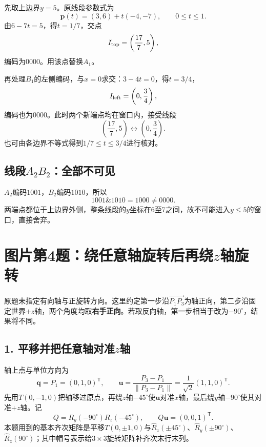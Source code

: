 先取上边界$y=5$。原线段参数式为
\[
\boldsymbol p(t)=(3,6)+t(-4,-7),\qquad0\leq t\leq1.
\]
由$6-7t=5$，得$t=1/7$，交点
\[
I_{\rm top}=\left(\frac{17}{7},5\right),
\]
编码为$0000$。用该点替换$A_1$。

再处理$B_1$的左侧编码，与$x=0$求交：$3-4t=0$，得$t=3/4$，
\[
I_{\rm left}=\left(0,\frac34\right),
\]
编码也为$0000$。此时两个新端点均在窗口内，接受线段
\[
\boxed{\left(\frac{17}{7},5\right)\longleftrightarrow\left(0,\frac34\right).}
\]
也可由各边界不等式得到$1/7\leq t\leq3/4$进行核对。

\subsection*{线段$A_2B_2$：全部不可见}
$A_2$编码$1001$，$B_2$编码$1010$，所以
\[
1001\mathbin{\&}1010=1000\ne0000.
\]
两端点都位于上边界外侧，整条线段的$y$坐标在6至7之间，故不可能进入$y\leq5$的窗口，直接舍弃。

\section{图片第4题：绕任意轴旋转后再绕$z$轴旋转}
\sol 原题未指定有向轴与正旋转方向。这里约定第一步沿$\overrightarrow{P_1P_3}$为轴正向，第二步沿固定世界$+z$轴，两个角度均取\textbf{右手正向}。若取反向轴，第一步相当于改为$-90^\circ$，结果将不同。

\subsection*{1. 平移并把任意轴对准$z$轴}
轴上点与单位方向为
\[
\boldsymbol q=P_1=(0,1,0)^{\mathsf T},\qquad
\boldsymbol u=\frac{P_3-P_1}{\|P_3-P_1\|}
=\frac{1}{\sqrt2}(1,1,0)^{\mathsf T}.
\]
先用$T(0,-1,0)$把轴移过原点，再绕$z$轴$-45^\circ$使$\boldsymbol u$对准$x$轴，最后绕$y$轴$-90^\circ$使其对准$+z$轴。记
\[
Q=R_y(-90^\circ)R_z(-45^\circ),\qquad Q\boldsymbol u=(0,0,1)^{\mathsf T}.
\]
本题用到的基本齐次矩阵是平移$T(0,\pm1,0)$与$\widehat R_z(\pm45^\circ)$、$\widehat R_y(\pm90^\circ)$、$\widehat R_z(90^\circ)$；其中帽号表示给$3\times3$旋转矩阵补齐次末行末列。

